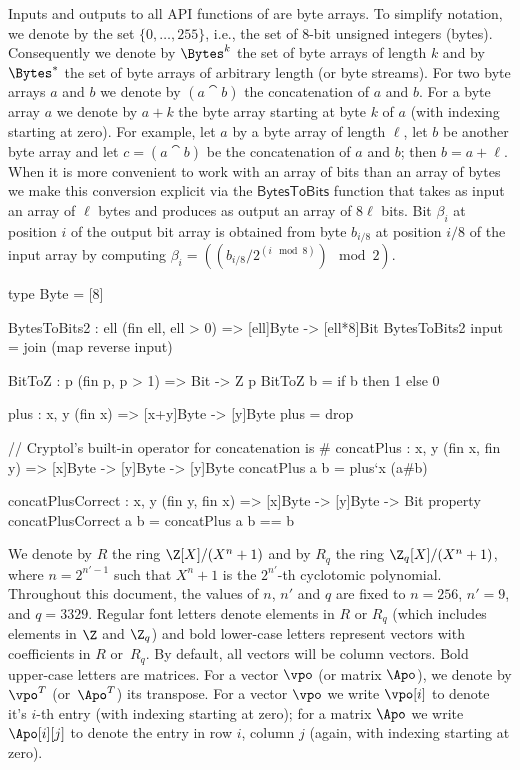 Inputs and outputs to all API functions of \Kyber are byte arrays.
To simplify notation, we denote by \Bytes the set $\{0,\dots,255\}$, i.e., 
the set of $8$-bit unsigned integers (bytes). 
Consequently we denote by $\Bytes^k$ the set of byte arrays of length $k$
and by $\Bytes^*$ the set of byte arrays of arbitrary length (or byte streams).
For two byte arrays $a$ and $b$ we denote by $(a\cat b)$ the concatenation
of $a$ and $b$.
For a byte array $a$ we denote by $a+k$ the byte array
starting at byte $k$ of $a$ (with indexing starting at zero).
For example, let $a$ by a byte array of length $\ell$, let $b$
be another byte array and let $c = (a\cat b)$ be the concatenation
of $a$ and $b$; then $b = a+\ell$.
When it is more convenient to work with an array of bits than an
array of bytes we make this conversion explicit via the $\mathsf{BytesToBits}$ 
function that takes as input an array of $\ell$ bytes and produces as
output an array of $8\ell$ bits. Bit $\beta_i$ at position $i$ of the output bit array 
is obtained from byte $b_{i/8}$ at position $i/8$ of the input array
by computing $\beta_i = \left((b_{i/8} / 2^{(i\mod 8)}) \mod 2\right)$.

\begin{code}
  type Byte = [8]
  
  BytesToBits2 : {ell} (fin ell, ell > 0) => [ell]Byte -> [ell*8]Bit
  BytesToBits2 input = join (map reverse input)

  BitToZ : {p} (fin p, p > 1) => Bit -> Z p
  BitToZ b = if b then 1 else 0
  
  plus : {x, y} (fin x) => [x+y]Byte -> [y]Byte
  plus = drop

  // Cryptol's built-in operator for concatenation is #
  concatPlus : {x, y} (fin x, fin y) => [x]Byte -> [y]Byte -> [y]Byte
  concatPlus a b = plus`{x} (a#b)
  
  concatPlusCorrect : {x, y} (fin y, fin x) => [x]Byte -> [y]Byte -> Bit
  property concatPlusCorrect a b = concatPlus a b == b
\end{code}
We denote by $R$ the ring $\Z[X]/(X^{n}+1)$ and by $R_q$ the ring $\Z_q[X]/(X^{n}+1)$, 
where $n=2^{n'-1}$ such that $X^{n}+1$ is the $2^{n'}$-th cyclotomic polynomial. 
Throughout this document, the values of $n$, $n'$ and $q$ are fixed to $n=256$, $n'=9$, and $q=3329$.
Regular font letters denote elements in $R$ or $R_q$ (which includes elements in $\Z$ and $\Z_q$) 
and bold lower-case letters represent vectors with coefficients in $R$ or~$R_q$.  
By default, all vectors will be column vectors. Bold upper-case letters are matrices. 
For a vector $\vpo$ (or matrix $\Apo$), we denote by $\vpo^T$ (or~$\Apo^T$) its transpose.
For a vector $\vpo$ we write $\vpo[i]$ to denote it's $i$-th entry (with indexing starting at zero);
for a matrix $\Apo$ we write $\Apo[i][j]$ to denote the entry in row $i$, column $j$ 
(again, with indexing starting at zero).

